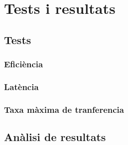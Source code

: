 \chapter{Tests i resultats}
\section{Tests}
\subsection{Eficiència}
\subsection{Latència}
\subsection{Taxa màxima de tranferencia}
\section{Anàlisi de resultats}
